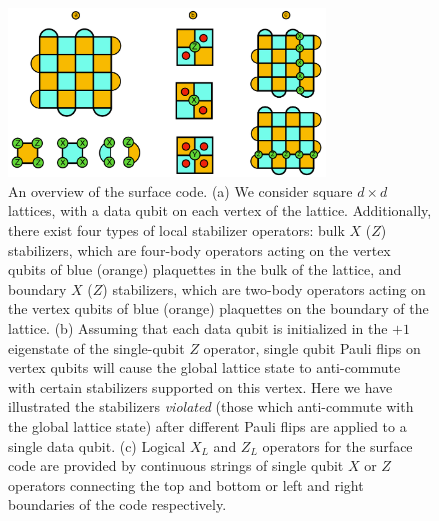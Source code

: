 \documentclass[onecolumn,preprintnumbers,amsmath,amssymb,notitlepage,nofootinbib,longbibliography,superscriptaddress]{revtex4-1}
\begin{document}
      \begin{figure}
      \centering
          \includegraphics[width=0.75\textwidth]{surface_code.pdf}
      \caption{An overview of the surface code. (a) We consider square $d\times d$ lattices, with a data qubit on each vertex of the lattice. Additionally, there exist four types of local stabilizer operators: bulk $X$ ($Z$) stabilizers, which are four-body operators acting on the vertex qubits of blue (orange) plaquettes in the bulk of the lattice, and boundary $X$ ($Z$) stabilizers, which are two-body operators acting on the vertex qubits of blue (orange) plaquettes on the boundary of the lattice. (b) Assuming that each data qubit is initialized in the $+1$ eigenstate of the single-qubit $Z$ operator, single qubit Pauli flips on vertex qubits will cause the global lattice state to anti-commute with certain stabilizers supported on this vertex. Here we have illustrated the stabilizers \textit{violated} (those which anti-commute with the global lattice state) after different Pauli flips are applied to a single data qubit. (c) Logical $X_L$ and $Z_L$ operators for the surface code are provided by continuous strings of single qubit $X$ or $Z$ operators connecting the top and bottom or left and right boundaries of the code respectively.}\label{f:surface_code}
    \end{figure}
\end{document}
